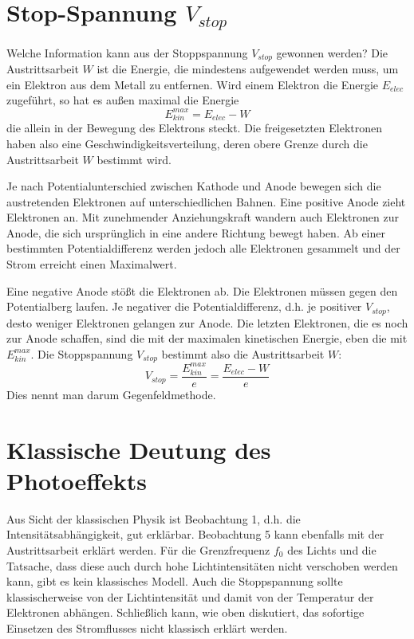 \section{Stop-Spannung  $V_{stop}$ }

Welche Information kann aus der Stoppspannung $V_{stop}$ gewonnen werden? Die Austrittsarbeit $W$ ist die Energie, die mindestens aufgewendet werden muss, um ein Elektron aus dem Metall zu entfernen. Wird einem Elektron die Energie $E_{elec}$ zugeführt, so hat es außen maximal die Energie 
\begin{equation}
    E_{kin}^{max} = E_{elec} - W
\end{equation}
die allein in der Bewegung des Elektrons steckt. Die freigesetzten Elektronen haben also eine Geschwindigkeitsverteilung, deren obere Grenze durch die Austrittsarbeit $W$ bestimmt wird.

Je nach Potentialunterschied zwischen Kathode und Anode bewegen sich die austretenden Elektronen auf unterschiedlichen Bahnen. Eine positive Anode zieht Elektronen an. Mit zunehmender Anziehungskraft wandern auch Elektronen zur Anode, die sich ursprünglich in eine andere Richtung bewegt haben. Ab einer bestimmten Potentialdifferenz werden jedoch alle Elektronen gesammelt und der Strom erreicht einen Maximalwert.

Eine negative Anode stößt die Elektronen ab. Die Elektronen müssen gegen den Potentialberg laufen. Je negativer die Potentialdifferenz, d.h. je positiver $V_{stop}$, desto weniger Elektronen gelangen zur Anode. Die letzten Elektronen, die es noch zur Anode schaffen, sind die mit der maximalen kinetischen Energie, eben die mit $ E_{kin}^{max}$. Die Stoppspannung $V_{stop}$ bestimmt also die Austrittsarbeit $W$:
\begin{equation}
    V_{stop} = \frac{E_{kin}^{max}}{e} = \frac{E_{elec} - W}{e}  
\end{equation}
Dies nennt man darum Gegenfeldmethode.


\section{Klassische Deutung des Photoeffekts}

Aus Sicht der klassischen Physik ist Beobachtung 1, d.h. die Intensitätsabhängigkeit, gut erklärbar. Beobachtung 5 kann ebenfalls mit der Austrittsarbeit erklärt werden. Für die Grenzfrequenz $f_0$ des Lichts und die Tatsache, dass diese auch durch hohe Lichtintensitäten nicht verschoben werden kann, gibt es kein klassisches Modell. Auch die Stoppspannung sollte klassischerweise von der Lichtintensität und damit von der Temperatur der Elektronen abhängen. Schließlich kann, wie oben diskutiert, das sofortige Einsetzen des Stromflusses nicht klassisch erklärt werden.



